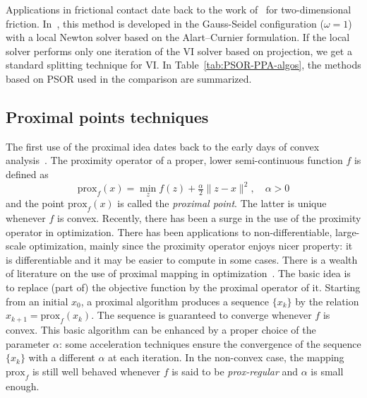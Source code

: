 Applications in frictional contact date back to the work of~\cite{Mitsopoulou.Doudoumis1988,Mitsopoulou.Doudoumis1987} for two-dimensional friction. In~\cite{Jourdan.Alart.ea98}, this method is developed in the Gauss-Seidel configuration ($\omega=1$) with a local Newton solver based on the Alart--Curnier formulation. If the local solver performs only one iteration of the VI solver based on projection, we get a standard splitting technique for VI. In Table~\ref{tab:PSOR-PPA-algos}, the methods based on PSOR used in the comparison are summarized.

\subsection{Proximal points techniques}\label{Sec:Prox}

The first use of the proximal idea dates back to the early days of convex analysis~\citep{Moreau1965}.
The proximity operator of a proper, lower semi-continuous function $f$ is defined as
\begin{equation}
 \mathrm{prox}_f(x) = \min_z f(z) + \tfrac{\alpha}{2}\|z-x\|^2,\quad \alpha>0
\end{equation}
and the point $\mathrm{prox}_f(x)$ is called the \emph{proximal point}.
The latter is unique whenever $f$ is convex.
Recently, there has been a surge in the use of the proximity operator in optimization.
There has been applications to non-differentiable, large-scale optimization,
mainly since the proximity operator enjoys nicer property: it is differentiable
and it may be easier to compute in some cases.
There is a wealth of literature on the use of proximal mapping in optimization~\citep{parikh2014proximal}.
The basic idea is to replace (part of) the objective function by the proximal operator of it.
Starting from an initial $x_0$, a proximal algorithm produces a sequence $\{x_k\}$ by the relation
$x_{k+1} = \mathrm{prox}_f(x_k)$. The sequence is guaranteed to converge whenever $f$ is convex.
This basic algorithm can be enhanced by a proper choice of the parameter $\alpha$:
some acceleration techniques ensure the convergence of the sequence $\{x_k\}$ with a different $\alpha$
at each iteration. In the non-convex case, the mapping $\mathrm{prox}_f$ is still well behaved
whenever $f$ is said to be \emph{prox-regular} and $\alpha$ is small enough.

